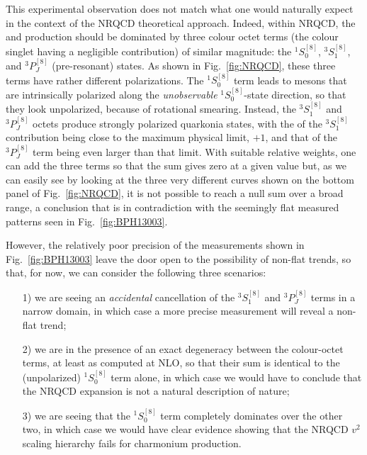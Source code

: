 This experimental observation does not match what one would naturally expect
in the context of the NRQCD theoretical approach. Indeed, within NRQCD, 
the \jpsi and \psip production should be dominated by three colour octet
terms (the colour singlet having a negligible contribution) of similar magnitude:
the $^1S^{[8]}_0$, $^3S^{[8]}_1$, and $^3P^{[8]}_J$ (pre-resonant) \ccbar states. 
As shown in Fig.~\ref{fig:NRQCD}, these three terms have rather different 
polarizations. The $^1S^{[8]}_0$ term leads to mesons that are intrinsically polarized 
along the \emph{unobservable} $^1S^{[8]}_0$-state direction, so that they look 
unpolarized, because of rotational smearing. Instead, the $^3S^{[8]}_1$ and 
$^3P^{[8]}_J$ octets produce strongly polarized quarkonia states, with the \lth
of the $^3S^{[8]}_1$ contribution being close to the maximum physical limit, $+1$,
and that of the $^3P^{[8]}_J$ term being even larger than that limit. 
With suitable relative weights, one can add the three terms so that the sum 
gives zero at a given \pt value but, as we can easily see by looking at the three 
very different curves shown on the bottom panel of Fig.~\ref{fig:NRQCD}, it is
not possible to reach a null sum over a broad \pt range, a conclusion that is in
contradiction with the seemingly flat measured patterns seen in Fig.~\ref{fig:BPH13003}.

However, the relatively poor precision of the measurements shown in Fig.~\ref{fig:BPH13003}
leave the door open to the possibility of non-flat trends, so that, for now, we can consider
the following three scenarios:
\begin{enumerate}
\item[1)] we are seeing an \emph{accidental} cancellation of the $^3S^{[8]}_1$ and 
$^3P^{[8]}_J$ terms in a narrow \pt domain, in which case a more precise measurement 
will reveal a non-flat trend;
\item[2)] we are in the presence of an exact degeneracy between the colour-octet terms,
at least as computed at NLO,
so that their sum is identical to the (unpolarized) $^1S^{[8]}_0$ term alone, 
in which case we would have to conclude that the NRQCD expansion is not a natural 
description of nature;
\item[3)] we are seeing that the $^1S^{[8]}_0$ term completely dominates over the other two, 
in which case we would have clear evidence showing that the NRQCD $v^2$ scaling 
hierarchy fails for charmonium production.
\end{enumerate}


